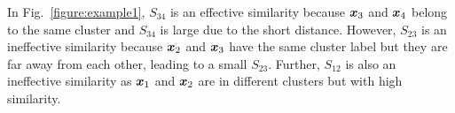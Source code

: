\begin{example}
In Fig.~\ref{figure:example1},
$S_{34}$ is an effective similarity because $\bm{x}_3$ and $\bm{x}_4$ belong to the same cluster 
and $S_{34}$ is large due to the short distance.
However, $S_{23}$ is an ineffective similarity because $\bm{x}_2$ and $\bm{x}_3$
have the same cluster label but they are far away from each other, leading to a small $S_{23}$.
Further, $S_{12}$ is also an ineffective similarity as $\bm{x}_1$ and $\bm{x}_2$ are in different clusters but with high similarity.
\end{example}









